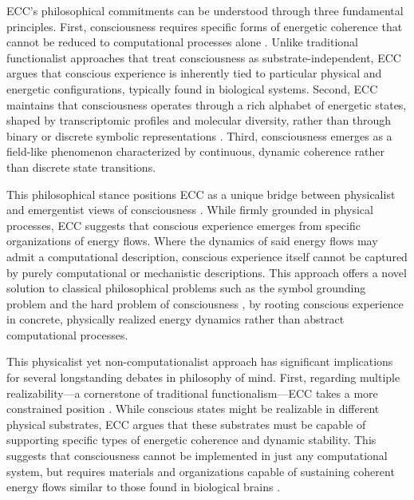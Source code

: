 \begin{refsection}
ECC's philosophical commitments can be understood through three fundamental principles. First, consciousness requires specific forms of energetic coherence that cannot be reduced to computational processes alone \cite{van1995might}. Unlike traditional functionalist approaches that treat consciousness as substrate-independent, ECC argues that conscious experience is inherently tied to particular physical and energetic configurations, typically found in biological systems. Second, ECC maintains that consciousness operates through a rich alphabet of energetic states, shaped by transcriptomic profiles and molecular diversity, rather than through binary or discrete symbolic representations \cite{wheeler2005reconstructing}. Third, consciousness emerges as a field-like phenomenon characterized by continuous, dynamic coherence rather than discrete state transitions.

This philosophical stance positions ECC as a unique bridge between physicalist and emergentist views of consciousness \cite{jonas2001phenomenon}. While firmly grounded in physical processes, ECC suggests that conscious experience emerges from specific organizations of energy flows. Where the dynamics of said energy flows may admit a computational description, conscious experience itself cannot be captured by purely computational or mechanistic descriptions. This approach offers a novel solution to classical philosophical problems such as the symbol grounding problem \cite{harnad1990symbol} and the hard problem of consciousness \cite{chalmers1997conscious}, by rooting conscious experience in concrete, physically realized energy dynamics rather than abstract computational processes.

This physicalist yet non-computationalist approach has significant implications for several longstanding debates in philosophy of mind. First, regarding multiple realizability—a cornerstone of traditional functionalism—ECC takes a more constrained position \cite{piccinini2013neural, anderson2024physical}. While conscious states might be realizable in different physical substrates, ECC argues that these substrates must be capable of supporting specific types of energetic coherence and dynamic stability. This suggests that consciousness cannot be implemented in just any computational system, but requires materials and organizations capable of sustaining coherent energy flows similar to those found in biological brains \cite{van1995might}.


\end{refsection}
